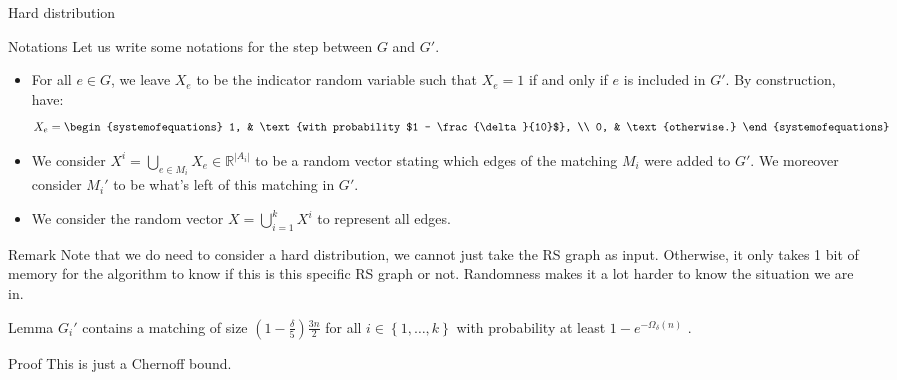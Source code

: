 \documentclass[a4paper]{article}
\begin{document}
\begin{parag}{Hard distribution}
    \begin{subparag}{Notations}
        Let us write some notations for the step between $G$ and $G'$. 
        \begin{itemize}[left=0pt]
            \item For all $e \in G$, we leave $X_e$ to be the indicator random variable such that $X_e = 1$ if and only if $e$ is included in $G'$. By construction, have: 
        \[X_e = \begin{systemofequations} 1, & \text{with probability $1 - \frac{\delta}{10}$}, \\ 0, & \text{otherwise.} \end{systemofequations}\]
            \item We consider $X^i = \bigcup_{e \in M_i}^{} X_e \in \mathbb{R}^{\left|A_i\right|}$ to be a random vector stating which edges of the matching $M_i$ were added to $G'$. We moreover consider $M_i'$ to be what's left of this matching in $G'$.
            \item We consider the random vector $X = \bigcup_{i=1}^{k} X^i$ to represent all edges.
        \end{itemize}
    \end{subparag}

    \begin{subparag}{Remark}
        Note that we do need to consider a hard distribution, we cannot just take the RS graph as input. Otherwise, it only takes 1 bit of memory for the algorithm to know if this is this specific RS graph or not. Randomness makes it a lot harder to know the situation we are in.
    \end{subparag}
\end{parag}

\begin{parag}{Lemma}
    $G_i'$ contains a matching of size $\left(1 - \frac{\delta}{5}\right)\frac{3n}{2}$ for all $i \in \left\{1, \ldots, k\right\}$ with probability at least $1 - e^{-\Omega_{\delta}\left(n\right)}$ .

    \begin{subparag}{Proof}
        This is just a Chernoff bound.
    \end{subparag}
\end{parag}
\end{document}

